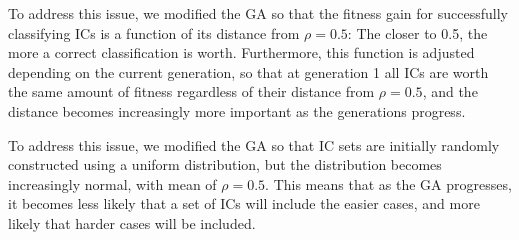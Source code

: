 To address this issue, we modified the GA so that the fitness gain for successfully classifying ICs is a function of its distance from $\rho = 0.5$: The 
closer to 0.5, the more a correct classification is worth. Furthermore, this function is adjusted depending on the current generation, so that at generation 1 
all ICs are worth the same amount of fitness regardless of their distance from $\rho = 0.5$, and the distance becomes increasingly more important as 
the generations progress.

To address this issue, we modified the GA so that IC sets are initially randomly constructed using a uniform distribution, but 
the distribution becomes increasingly normal, with mean of $\rho = 0.5$. This means that as the GA progresses, it becomes less likely that a 
set of ICs will include the easier cases, and more likely that harder cases will be included. 


